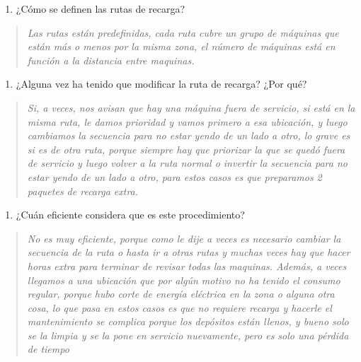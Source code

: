 \begin{enumerate}
\def\labelenumi{\arabic{enumi}.}
\setcounter{enumi}{1}
\item
  ¿Cómo se definen las rutas de recarga?
\end{enumerate}

\begin{quote}
\emph{Las rutas están predefinidas, cada ruta cubre un grupo de máquinas que están más o menos por la misma zona, el número de máquinas está en función a la distancia entre maquinas.}
\end{quote}

\begin{enumerate}
\def\labelenumi{\arabic{enumi}.}
\setcounter{enumi}{2}
\item
  ¿Alguna vez ha tenido que modificar la ruta de recarga? ¿Por qué?
\end{enumerate}

\begin{quote}
\emph{Si, a veces, nos avisan que hay una máquina fuera de servicio, si está en la misma ruta, le damos prioridad y vamos primero a esa ubicación, y luego cambiamos la secuencia para no estar yendo de un lado a otro, lo grave es si es de otra ruta, porque siempre hay que priorizar la que se quedó fuera de servicio y luego volver a la ruta normal o invertir la secuencia para no estar yendo de un lado a otro, para estos casos es que preparamos 2 paquetes de recarga extra.}
\end{quote}

\begin{enumerate}
\def\labelenumi{\arabic{enumi}.}
\setcounter{enumi}{3}
\item
  ¿Cuán eficiente considera que es este procedimiento?
\end{enumerate}

\begin{quote}
\emph{No es muy eficiente, porque como le dije a veces es necesario cambiar la secuencia de la ruta o hasta ir a otras rutas y muchas veces hay que hacer horas extra para terminar de revisar todas las maquinas. Además, a veces llegamos a una ubicación que por algún motivo no ha tenido el consumo regular, porque hubo corte de energía eléctrica en la zona o alguna otra cosa, lo que pasa en estos casos es que no requiere recarga y hacerle el mantenimiento se complica porque los depósitos están llenos, y bueno solo se la limpia y se la pone en servicio nuevamente, pero es solo una pérdida de tiempo}
\end{quote}

